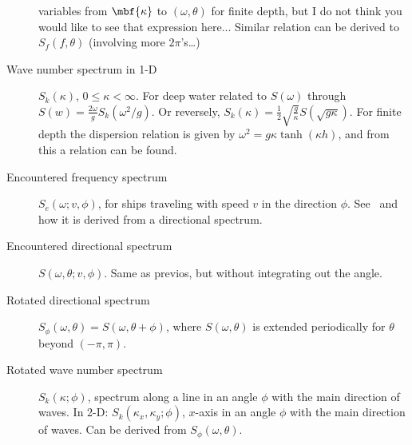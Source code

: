 \documentclass{article}
\begin{document}
\begin{description}
variables from $\mbf{\kappa}$ to $({\omega},{\theta})$ for finite depth, but I do not
think you would like to see that expression  here...
Similar relation can be derived to $S_f(f,{\theta})$ (involving more $2{\pi}$'s\ldots)\\
\item[Wave number spectrum in 1-D] $S_k({\kappa})$, $0\leq {\kappa} < \infty$. For deep water related to $S({\omega})$
  through $S(w)=\frac{2{\omega}}{g}S_k({\omega}^2/g)$. Or reversely, $S_k({\kappa})=\frac{1}{2}\sqrt{\frac{g}{{\kappa}}}S(\sqrt{g{\kappa}})$. For finite depth the
  dispersion relation is given by
  ${\omega}^2=g{\kappa}\tanh({\kappa}h)$, and from this a relation can 
  be found.\\
\item[Encountered frequency spectrum] $S_e({\omega};v,{\phi})$, for ships traveling with speed 
  $v$  in the direction ${\phi}$.
  See~\cite{Lindgren-Rychlik-Prevosto_97b} and
  ~\cite{Podgorski-Rychlik-Machado} how it
  is derived from a directional spectrum.
\item[Encountered directional spectrum] $S({\omega},{\theta};
  v,{\phi})$. Same as previos, but without integrating out the angle.\\  
\item[Rotated directional spectrum]
  $S_{\phi}({\omega},{\theta})=S({\omega},{\theta}+{\phi})$, where
  $S({\omega},{\theta})$ is extended periodically for ${\theta}$
  beyond $(-{\pi},{\pi})$.
\item[Rotated wave number spectrum] $S_k({\kappa};{\phi})$, spectrum
  along a line in an angle ${\phi}$ with the main direction of waves. In 2-D: $S_k({\kappa}_x,{\kappa}_y;{\phi})$, $x$-axis
  in an angle ${\phi}$ with the main direction of waves. Can be
  derived from $S_{\phi}({\omega},{\theta})$.
\end{description}
\end{document}
